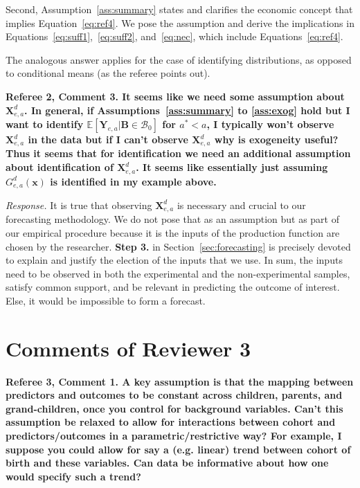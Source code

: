 Second, Assumption~\ref{ass:summary} states and clarifies the economic concept that implies Equation~\eqref{eq:ref4}. We pose the assumption and derive the implications in Equations~\eqref{eq:suff1},~\eqref{eq:suff2}, and~\eqref{eq:nec},  which include Equations~\eqref{eq:ref4}. 

The analogous answer applies for the case of identifying distributions, as opposed to conditional means (as the referee points out).

\noindent \textbf{Referee 2, Comment 3. It seems like we need some assumption about $\bm{X}_{e,a}^d$. In general, if Assumptions~\ref{ass:summary} to \ref{ass:exog} hold but I want to identify $\mathbb{E} \left[ \bm{Y}_{e,a} | \bm{B} \in \mathcal{B}_0 \right]$ for $a^* < a$, I typically won't observe $\bm{X}_{e,a}^d$ in the data but if I can't observe $\bm{X}_{e,a}^d$ why is exogeneity useful? Thus it seems that for identification we need an additional assumption about identification of $\bm{X}_{e,a}^d$. It seems like essentially just assuming $G_{e,a}^d \left( \bm{x} \right)$ is identified in my example above.} 

\noindent \textit{Response.} It is true that observing $\bm{X}_{e,a}^d$ is necessary and crucial to our forecasting methodology. We do not pose that as an assumption but as part of our empirical procedure because it is the inputs of the production function are chosen by the researcher. \textbf{Step 3.} in Section~\ref{sec:forecasting} is precisely devoted to explain and justify the election of the inputs that we use. In sum, the inputs need to be observed in both the experimental and the non-experimental samples, satisfy common support, and be relevant in predicting the outcome of interest. Else, it would be impossible to form a forecast.

\section*{Comments of Reviewer 3}

\noindent \textbf{Referee 3, Comment 1. A key assumption is that the mapping between predictors and outcomes to be constant across children, parents, and grand-children, once you control for background variables. Can't this assumption be relaxed to allow for interactions between cohort and predictors/outcomes in a parametric/restrictive way? For example, I suppose you could allow for say a (e.g. linear) trend between cohort of birth and these variables. Can data be informative about how one would specify such a trend?}

